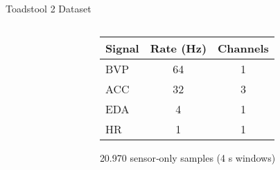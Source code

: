 \begin{frame}{Toadstool 2 Dataset}
\begin{columns}[T]
\begin{column}{0.5\textwidth}
\begin{center}
			\end{center}
			
		\end{column}
		\begin{column}{0.5\textwidth}
		\centering
		\small
		\begin{tabular}{lcc}
		\toprule
		\textbf{Signal} & \textbf{Rate (Hz)} & \textbf{Channels} \\
		\midrule
		BVP  & 64 & 1      \\
		ACC  & 32 & 3 		\\
		EDA  & 4  & 1      \\
		HR   & 1  & 1      \\
		\bottomrule
		\end{tabular}
		
		\begin{block}{}
			20.970 sensor‐only samples (4 s windows)
		\end{block}

		\end{column}
		
	\end{columns}
\end{frame}


